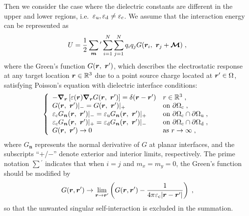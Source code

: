 Then we consider the case where the dielectric constants are different in the upper and lower regions, i.e.~$\varepsilon_{\mathrm{u}}, \varepsilon_{\mathrm{d}} \neq \varepsilon_{\mathrm{c}}$.
We assume that the interaction energy can be represented as
\begin{equation}\label{eq:U_direct}
    U = \frac{1}{2} \sum_{\boldsymbol{m}} {}^\prime \sum_{i=1}^{N}\sum_{j=1}^{N} q_i q_j G(\boldsymbol{r}_i,~\boldsymbol{r}_j + \bm{\mathcal{M}})\;,
\end{equation}
where the Green's function $G(\boldsymbol{r},~\boldsymbol{r}^\prime)$, which describes the electrostatic response at any target location $\boldsymbol{r}\in\mathbb{R}^3$ due to a point source charge located at $\boldsymbol{r}^\prime\in\Omega$, satisfying Poisson's equation with dielectric interface conditions:
\begin{equation}
    \left\{
    \begin{array}{ll}
        - \boldsymbol{\nabla}_{\boldsymbol{r}} \left[ \varepsilon(\boldsymbol{r}) \boldsymbol{\nabla}_{\boldsymbol{r}} G(\boldsymbol{r},~\boldsymbol{r}^\prime) \right] = \delta(\boldsymbol{r} - \boldsymbol{r}^\prime) & r \in \mathbb{R}^3 \;, \\
        G(\boldsymbol{r},~\boldsymbol{r}^\prime) |_{-} = G(\boldsymbol{r},~\boldsymbol{r}^\prime) |_{+} & \text{on}~\partial\Omega_{\text{c}}\;, \\
        \varepsilon_{\text{c}} G_{\bm{n}}(\boldsymbol{r},~\boldsymbol{r}^\prime) |_{-} = \varepsilon_{\text{u}}  G_{\bm{n}}(\boldsymbol{r},~\boldsymbol{r}^\prime) |_{+} & \text{on}~\partial \Omega_{\text{c}} \cap \partial \Omega_{\text{u}}\;, \\
        \varepsilon_{\text{c}} G_{\bm{n}}(\boldsymbol{r},~\boldsymbol{r}^\prime) |_{+} = \varepsilon_{\text{d}} G_{\bm{n}}(\boldsymbol{r},~\boldsymbol{r}^\prime) |_{-} & \text{on}~\partial \Omega_{\text{c}} \cap \partial \Omega_{\text{d}}\;, \\
        G(\boldsymbol{r},~\boldsymbol{r}^\prime) \to 0 & \text{as}~r \to \infty\;,
    \end{array}
    \right.
    \label{eq:Poisson_G}
\end{equation}
where $G_{\bm{n}}$ represents the normal derivative of $G$ at planar interfaces, and the subscripts ``$+$/$-$'' denote exterior and interior limits, respectively. 
The prime notation $\sum{}^\prime$ indicates that when $i=j$ and $m_x = m_y = 0$, the Green's function should be modified by
\begin{equation}\label{eq::Green}
    G(\boldsymbol{r}, \boldsymbol{r}^\prime) \rightarrow \lim_{\boldsymbol{r} \to \boldsymbol{r}^\prime} \left(G(\boldsymbol{r}, \boldsymbol{r}^\prime) - \frac{1}{4\pi \varepsilon_{\text{c}}\lvert\boldsymbol{r} - \boldsymbol{r}^\prime\rvert} \right)\;,
\end{equation}
so that the unwanted singular self-interaction is excluded in the summation.


